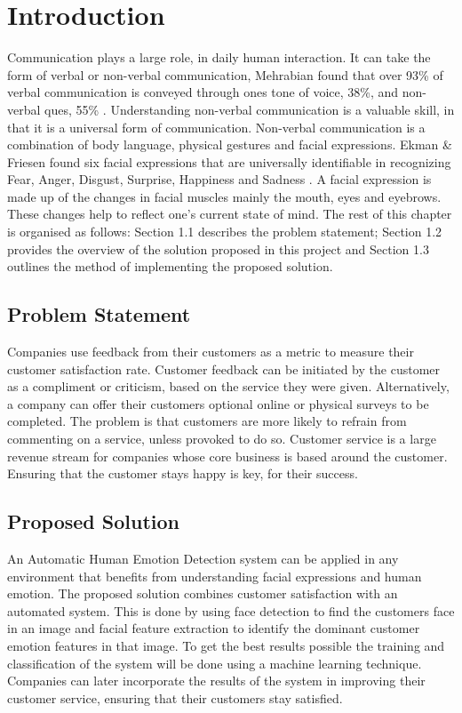 ﻿
\chapter{Introduction}


Communication plays a large role, in daily human interaction. It can take the form of verbal or non-verbal communication, Mehrabian found that over 93\% of verbal communication is conveyed through ones tone of voice, 38\%,  and non-verbal ques, 55\% \cite{mehrabian}. Understanding non-verbal communication is a valuable skill, in that it is a universal form of communication. 
Non-verbal communication is a combination of body language, physical gestures and facial expressions. Ekman \& Friesen found six facial expressions that are universally identifiable in recognizing Fear, Anger, Disgust, Surprise, Happiness and Sadness \cite{ekman}. A facial expression is made up of the changes in facial muscles mainly the mouth, eyes and eyebrows. These changes help to reflect one’s current state of mind. 
\newline
The rest of this chapter is organised as follows: Section 1.1 describes the problem statement; Section 1.2 provides the overview of the solution proposed in this project and Section 1.3 outlines the method of implementing the proposed solution.

\section{Problem Statement}
Companies use feedback from their customers as a metric to measure their customer satisfaction rate. Customer feedback can be initiated by the customer as a compliment or criticism, based on the service they were given. Alternatively, a company can offer their customers optional online or physical surveys to be completed. The problem is that customers are more likely to refrain from commenting on a service, unless provoked to do so. Customer service is a large revenue stream for companies whose core business is based around the customer. Ensuring that the customer stays happy is key, for their success. 

\section{Proposed Solution}
An Automatic Human Emotion Detection system can be applied in any environment that benefits from understanding facial expressions and human emotion.
The proposed solution combines customer satisfaction with an automated system. This is done by using face detection to find the customers face in an image and facial feature extraction to identify the dominant customer emotion features in that image. To get the best results possible the training and classification of the system will be done using a machine learning technique. Companies can later incorporate the results of the system in improving their customer service, ensuring that their customers stay satisfied.

